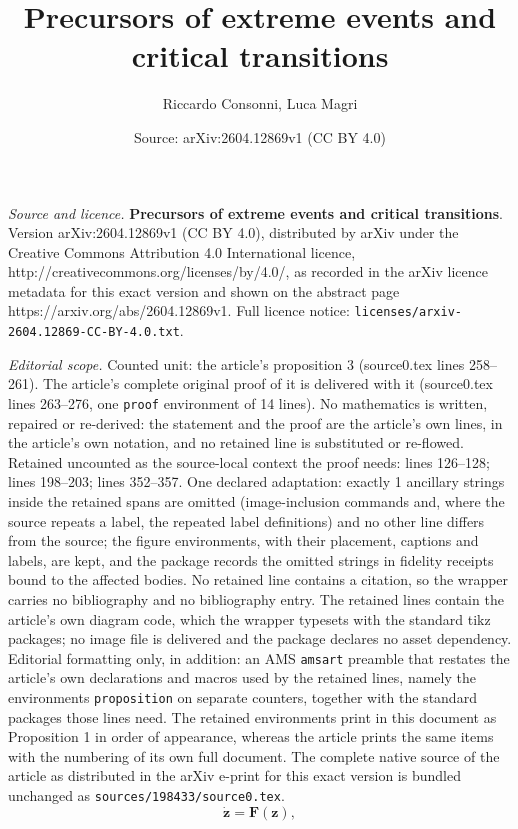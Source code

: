 \documentclass[10pt,a4paper]{amsart}
\title{\textbf{Precursors of extreme events and critical transitions}}
\author{Riccardo Consonni, Luca Magri}
\date{Source: arXiv:2604.12869v1 (CC BY 4.0)}
\begin{document}
\maketitle

\noindent\emph{Source and licence.} \textbf{Precursors of extreme events and critical transitions}. Version arXiv:2604.12869v1 (CC BY 4.0), distributed by arXiv under the Creative Commons Attribution 4.0 International licence, http://creativecommons.org/licenses/by/4.0/, as recorded in the arXiv licence metadata for this exact version and shown on the abstract page https://arxiv.org/abs/2604.12869v1. Full licence notice: \texttt{licenses/arxiv-2604.12869-CC-BY-4.0.txt}.\par\smallskip

\noindent\textit{Editorial scope.} Counted unit: the article's proposition 3 (source0.tex lines 258--261). The article's complete original proof of it is delivered with it (source0.tex lines 263--276, one \texttt{proof} environment of 14 lines). No mathematics is written, repaired or re-derived: the statement and the proof are the article's own lines, in the article's own notation, and no retained line is substituted or re-flowed.  Retained uncounted as the source-local context the proof needs: lines 126--128; lines 198--203; lines 352--357.  One declared adaptation: exactly 1 ancillary strings inside the retained spans are omitted (image-inclusion commands and, where the source repeats a label, the repeated label definitions) and no other line differs from the source; the figure environments, with their placement, captions and labels, are kept, and the package records the omitted strings in fidelity receipts bound to the affected bodies.  No retained line contains a citation, so the wrapper carries no bibliography and no bibliography entry.  The retained lines contain the article's own diagram code, which the wrapper typesets with the standard tikz packages; no image file is delivered and the package declares no asset dependency.  Editorial formatting only, in addition: an AMS \texttt{amsart} preamble that restates the article's own declarations and macros used by the retained lines, namely the environments \texttt{proposition} on separate counters, together with the standard packages those lines need.  The retained environments print in this document as Proposition 1 in order of appearance, whereas the article prints the same items with the numbering of its own full document.  The complete native source of the article as distributed in the arXiv e-print for this exact version is bundled unchanged as \texttt{sources/198433/source0.tex}.
\begin{equation} \label{dynamical_system}
\dot{\mathbf{z}} = \mathbf{F}(\mathbf{z}),
\end{equation}
\end{document}
